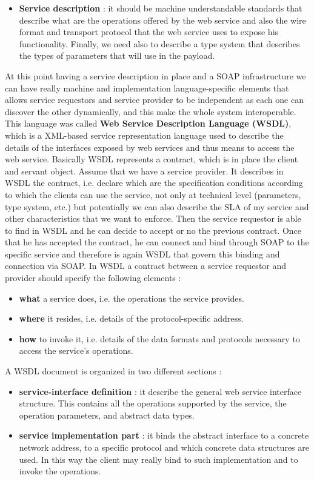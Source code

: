 \begin{itemize}
    \item \textbf{Service description} : it should be machine understandable standards that describe what are the operations offered by the web service and also the wire format and transport protocol that the web service uses to expose his functionality. Finally, we need also to describe a type system that describes the types of parameters that will use in the payload.
\end{itemize}
At this point having a service description in place and a SOAP infrastructure we can have really machine and implementation language-specific elements that allows service requestors and service provider to be independent as each one can discover the other dynamically, and this make the whole system interoperable. This language was called \textbf{Web Service Description Language (WSDL)}, which is a XML-based service representation language used to describe the details of the interfaces exposed by web services and thus means to access the web service. Basically WSDL represents a contract, which is in place the client and servant object. Assume that we have a service provider. It describes in WSDL the contract, i.e. declare which are the specification conditions according to which the clients can use the service, not only at technical level (parameters, type system, etc.) but potentially we can also describe the SLA of my service and other characteristics that we want to enforce. Then the service requestor is able to find in WSDL and he can decide to accept or no the previous contract. Once that he has accepted the contract, he can connect and bind through SOAP to the specific service and therefore is again WSDL that govern this binding and connection via SOAP. In WSDL a contract between a service requestor and provider should specify the following elements :
\begin{itemize}
    \item \textbf{what} a service does, i.e. the operations the service provides.
    \item \textbf{where} it resides, i.e. details of the protocol-specific address.
    \item \textbf{how} to invoke it, i.e. details of the data formats and protocols necessary to access the service's operations.
\end{itemize}
A WSDL document is organized in two different sections :
\begin{itemize}
    \item \textbf{service-interface definition} : it describe the general web service interface structure. This contains all the operations supported by the service, the operation parameters, and abstract data types.
    \item \textbf{service implementation part} : it binds the abstract interface to a concrete network address, to a specific protocol and which concrete data structures are used. In this way the client may really bind to such implementation and to invoke the operations.
\end{itemize}
